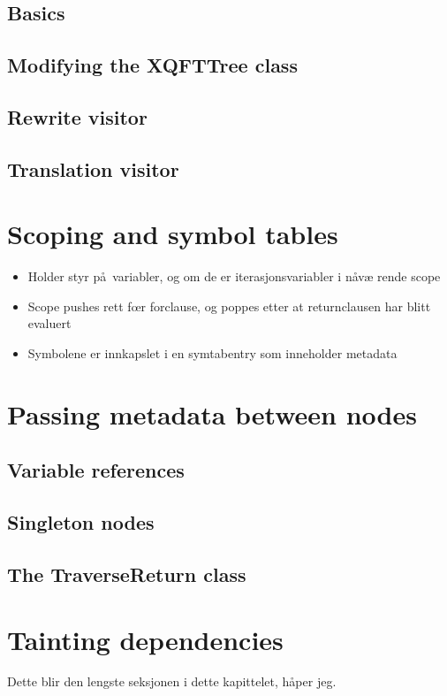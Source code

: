 \subsection{Basics}
\subsection{Modifying the XQFTTree class}
\subsection{Rewrite visitor}
\subsection{Translation visitor}

\section{Scoping and symbol tables}
\begin{itemize}
  \item Holder styr p\aa~variabler, og om de er iterasjonsvariabler i n\aa v\ae
  rende scope
  \item Scope pushes rett f\oe r forclause, og poppes etter at returnclausen har
  blitt evaluert
  \item Symbolene er innkapslet i en symtabentry som inneholder metadata
\end{itemize}

\section{Passing metadata between nodes}
\subsection{Variable references}
\subsection{Singleton nodes}
\subsection{The TraverseReturn class}

\section{Tainting dependencies}
Dette blir den lengste seksjonen i dette kapittelet, h\aa per jeg.
